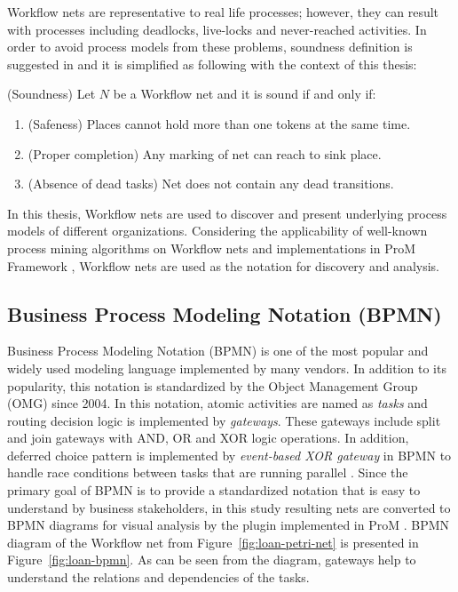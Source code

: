 Workflow nets are representative to real life processes; however, they can result with processes including deadlocks, live-locks and never-reached activities. In order to avoid process models from these problems, soundness definition is suggested in \cite{van1998application} and it is simplified as following with the context of this thesis:
\theoremstyle{definition}
\begin{definition}{}
(Soundness) Let $N$ be a Workflow net and it is sound if and only if:
\begin{enumerate}
  \item  (Safeness) Places cannot hold more than one tokens at the same time.
  \item  (Proper completion) Any marking of net can reach to sink place.
  \item  (Absence of dead tasks) Net does not contain any dead transitions.  
\end{enumerate}
\end{definition}

In this thesis, Workflow nets are used to discover and present underlying process models of different organizations. Considering the applicability of well-known process mining algorithms on Workflow nets and implementations in ProM Framework \cite{verbeek2010prom}, Workflow nets are used as the notation for discovery and analysis.

\subsection{Business Process Modeling Notation (BPMN)}
\label{sec:bpmn} 
Business Process Modeling Notation (BPMN) is one of the most popular and widely used modeling language implemented by many vendors. In addition to its popularity, this notation is standardized by the Object Management Group (OMG) since 2004. In this notation, atomic activities are named as \textit{tasks} and routing decision logic is implemented by \textit{gateways}. These gateways include split and join gateways with AND, OR and XOR logic operations. In addition, deferred choice pattern is implemented by \textit{event-based XOR gateway} in BPMN to handle race conditions between tasks that are running parallel \cite{van2003workflow}. Since the primary goal of BPMN is to provide a standardized notation that is easy to understand by business stakeholders, in this study resulting nets are converted to BPMN diagrams for visual analysis by the plugin implemented in ProM \cite{kalenkovaprocess}. BPMN diagram of the Workflow net from Figure~\ref{fig:loan-petri-net} is presented in Figure~\ref{fig:loan-bpmn}. As can be seen from the diagram, gateways help to understand the relations and dependencies of the tasks.

